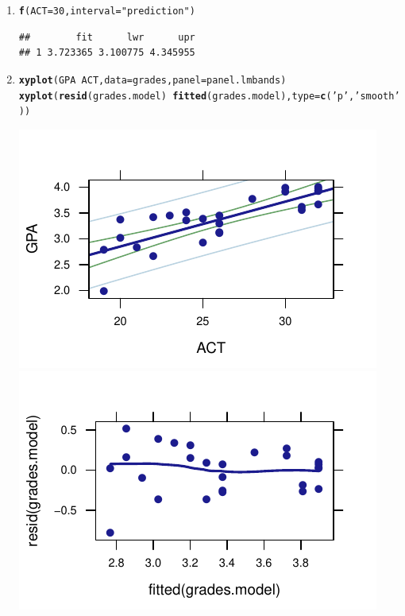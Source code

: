 \documentclass[twoside]{book}\usepackage[]{graphicx}\usepackage[]{xcolor}
\makeatletter
\def\maxwidth{ %
  \ifdim\Gin@nat@width>\linewidth
    \linewidth
  \else
    \Gin@nat@width
  \fi
}
\newcommand{\hlnum}[1]{\textcolor[rgb]{0.686,0.059,0.569}{#1}}%
\newcommand{\hlstr}[1]{\textcolor[rgb]{0.192,0.494,0.8}{#1}}%
\newcommand{\hlopt}[1]{\textcolor[rgb]{0,0,0}{#1}}%
\newcommand{\hlstd}[1]{\textcolor[rgb]{0.345,0.345,0.345}{#1}}%
\newcommand{\hlkwc}[1]{\textcolor[rgb]{0.333,0.667,0.333}{#1}}%
\newcommand{\hlkwd}[1]{\textcolor[rgb]{0.737,0.353,0.396}{\textbf{#1}}}%
\newenvironment{kframe}{%
 \def\at@end@of@kframe{}%
 \ifinner\ifhmode%
  \def\at@end@of@kframe{\end{minipage}}%
  \begin{minipage}{\columnwidth}%
 \fi\fi%
 \def\FrameCommand##1{\hskip\@totalleftmargin \hskip-\fboxsep
 \colorbox{shadecolor}{##1}\hskip-\fboxsep
     \hskip-\linewidth \hskip-\@totalleftmargin \hskip\columnwidth}%
 \MakeFramed {\advance\hsize-\width
   \@totalleftmargin\z@ \linewidth\hsize
   \@setminipage}}%
 {\par\unskip\endMakeFramed%
 \at@end@of@kframe}
\newenvironment{knitrout}{}{} %
\makeatother
\begin{document}
\begin{solution}
\begin{enumerate}
		\item
\begin{knitrout}
\color{fgcolor}\begin{kframe}
\begin{alltt}
\hlkwd{f}\hlstd{(}\hlkwc{ACT}\hlstd{=}\hlnum{30}\hlstd{,} \hlkwc{interval}\hlstd{=}\hlstr{"prediction"}\hlstd{)}
\end{alltt}
\begin{verbatim}
##        fit      lwr      upr
## 1 3.723365 3.100775 4.345955
\end{verbatim}
\end{kframe}
\end{knitrout}
		\item
\begin{knitrout}
\color{fgcolor}\begin{kframe}
\begin{alltt}
\hlkwd{xyplot}\hlstd{(GPA}\hlopt{~}\hlstd{ACT,}\hlkwc{data}\hlstd{=grades,}\hlkwc{panel}\hlstd{=panel.lmbands)}
\hlkwd{xyplot}\hlstd{(}\hlkwd{resid}\hlstd{(grades.model)} \hlopt{~} \hlkwd{fitted}\hlstd{(grades.model),}\hlkwc{type}\hlstd{=}\hlkwd{c}\hlstd{(}\hlstr{'p'}\hlstd{,}\hlstr{'smooth'}\hlstd{))}
\end{alltt}
\end{kframe}

{\centering \includegraphics[width=\maxwidth]{figures/fig-unnamed-chunk-217-1} 
\includegraphics[width=\maxwidth]{figures/fig-unnamed-chunk-217-2} 

}
\end{knitrout}
\end{enumerate}
\end{solution}
\end{document}
